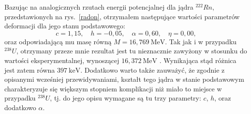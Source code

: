 \documentclass[a4paper,polish,twoside]{article}
\numberwithin{equation}{section}
\begin{document}
Bazując na analogicznych rzutach energii potencjalnej dla jądra $^{222}Rn$, przedstawionych na rys.~\ref{radon}, otrzymałem następujące wartości parametrów deformacji dla jego stanu podstawowego:
\begin{equation*}
c=1,15, \quad h=-0,05, \quad \alpha=0,60, \quad \eta= 0,00,
\end{equation*}
oraz odpowiadającą mu masę równą $M=16,769~\mathrm{MeV}$. Tak jak i w przypadku $^{238}U$, otrzymany przeze mnie rezultat jest tu nieznacznie zawyżony w stosunku do wartości eksperymentalnej, wynoszącej $16,372~\mathrm{MeV}$ \cite{brookhaven}. Wynikająca stąd różnica jest zatem równa $397~\mathrm{keV}$. Dodatkowo warto także zauważyć, że zgodnie z opisanymi wcześniej przewidywaniami, kształt tego jądra w stanie podstawowym charakteryzuje się większym stopniem komplikacji niż miało to miejsce w przypadku $^{238}U$, tj. do jego opisu wymagane są tu trzy parametry: $c$, $h$, oraz dodatkowo $\alpha$. 
\end{document}
